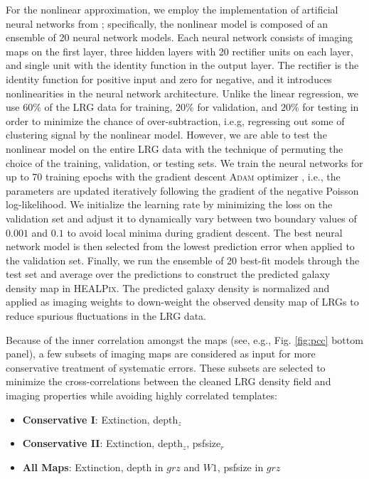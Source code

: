 For the nonlinear approximation, we employ the implementation of artificial neural networks from \cite{rezaie2021primordial}; specifically, the nonlinear model is composed of an ensemble of 20 neural network models. Each neural network consists of imaging maps on the first layer, three hidden layers with 20 rectifier units on each layer, and single unit with the identity function in the output layer. The rectifier is the identity function for positive input and zero for negative, and it introduces nonlinearities in the neural network architecture. Unlike the linear regression, we use $60\%$ of the LRG data for training, $20\%$ for validation, and $20\%$ for testing in order to minimize the chance of over-subtraction, i.e.g, regressing out some of clustering signal by the nonlinear model. However, we are able to test the nonlinear model on the entire LRG data with the technique of permuting the choice of the training, validation, or testing sets. We train the neural networks for up to 70 training epochs with the gradient descent \textsc{Adam} optimizer \citep{2017arXiv171105101L}, i.e., the parameters are updated iteratively following the gradient of the negative Poisson log-likelihood. We initialize the learning rate by minimizing the loss on the validation set and adjust it to dynamically vary between two boundary values of $0.001$ and $0.1$ to avoid local minima during gradient descent. The best neural network model is then selected from the lowest prediction error when applied to the validation set. Finally, we run the ensemble of 20 best-fit models through the test set and average over the predictions to construct the predicted galaxy density map in \textsc{HEALPix}. The predicted galaxy density is normalized and applied as imaging weights to down-weight the observed density map of LRGs to reduce spurious fluctuations in the LRG data. 

Because of the inner correlation amongst the maps (see, e.g., Fig. \ref{fig:pcc} bottom panel), a few subsets of imaging maps are considered as input for more conservative treatment of systematic errors. These subsets are selected to minimize the cross-correlations between the cleaned LRG density field and imaging properties while avoiding highly correlated templates:
\begin{itemize}
\item \textbf{Conservative I}: Extinction, depth$_{z}$
\item \textbf{Conservative II}: Extinction, depth$_{z}$, psfsize$_{r}$
\item \textbf{All Maps}: Extinction, depth in $grz$ and $W1$, psfsize in $grz$
\end{itemize}

